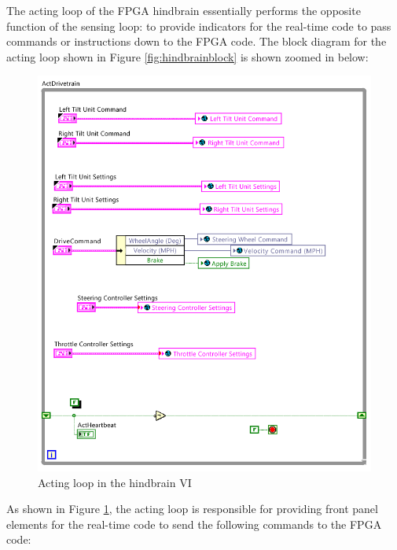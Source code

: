 The acting loop of the FPGA hindbrain essentially performs the opposite function of the sensing loop: to provide indicators for the real-time code to pass commands or instructions down to the FPGA code. The block diagram for the acting loop shown in Figure \ref{fig:hindbrainblock} is shown zoomed in below:

\newpage

\begin{figure}[h!]
\centering
\includegraphics[scale=1.5]{Photos/actloop.png}
\caption{Acting loop in the hindbrain VI}
\label{fig:actloop}
\end{figure}

\noindent As shown in Figure \ref{fig:actloop}, the acting loop is responsible for providing front panel elements for the real-time code to send the following commands to the FPGA code:

